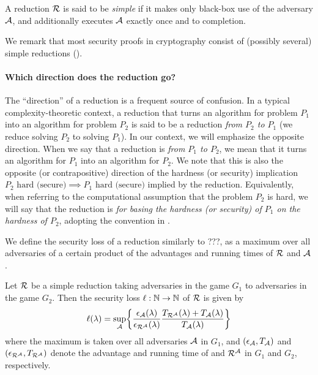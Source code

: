 \begin{definition}
  A reduction \(\redR\) is said to be \emph{simple}
  if it makes only black-box use of the adversary \(\mathcal{A}\),
  and additionally executes \(\mathcal{A}\) exactly once
  and to completion.
\end{definition}

We remark that most security proofs in cryptography
consist of (possibly several) simple reductions ().

\paragraph{Which direction does the reduction go?}
The ``direction'' of a reduction is a frequent source of confusion.
In a typical complexity-theoretic context,
a reduction that turns an algorithm for problem \(P_{1}\)
into an algorithm for problem \(P_{2}\)
is said to be a reduction \emph{from \(P_{2}\) to \(P_{1}\)}
(we reduce solving \(P_{2}\) to solving \(P_{1}\)).
In our context, we will emphasize the opposite direction.
When we say that a reduction is \emph{from \(P_{1}\) to \(P_{2}\)},
we mean that it turns an algorithm for \(P_{1}\) into an algorithm for \(P_{2}\).
We note that this is also the opposite (or contrapositive) direction of the hardness (or security) implication
\(P_{2} \text{ hard (secure)} \implies P_{1} \text{ hard (secure)}\)
implied by the reduction.
Equivalently,
when referring to the computational assumption that
the problem \(P_{2}\) is hard, we will say that the reduction
is \emph{for basing the hardness (or security) of \(P_{1}\) on the hardness of \(P_{2}\)},
adopting the convention in .

We define the security loss of a reduction \redR similarly to ???,
as a maximum over all adversaries \advA of a certain product of the
advantages and running times of \(\redR\) and \(\mathcal{A}\).

\begin{definition}\label{def:loss}
  Let \(\redR\) be a simple reduction
  taking adversaries in the game \(G_{1}\) to adversaries in the game \(G_{2}\).
  Then the security loss \(\ell : \mathbb{N} \to \mathbb{N}\) of \(\redR\) is given by
  \begin{equation}\label{eq:loss}
    \ell(\lambda) = \sup_{\advA} \left\{ \frac{\epsilon_{\advA}(\lambda)}{\epsilon_{\redR^{\advA}}(\lambda)}\frac{T_{\redR^{\advA}}(\lambda) + T_{\advA}(\lambda)}{T_{\advA}(\lambda)} \right\}
  \end{equation}
  where the maximum is taken over all adversaries \(\mathcal{A}\) in \(G_{1}\),
  and \((\epsilon_{\mathcal{A}}, T_{\mathcal{A}})\) and \((\epsilon_{\redR^{\advA}}, T_{\redR^{\advA}})\)
  denote the advantage and running time of \advA and \(\redR^{\advA}\) in \(G_{1}\) and \(G_{2}\), respectively.
\end{definition}

